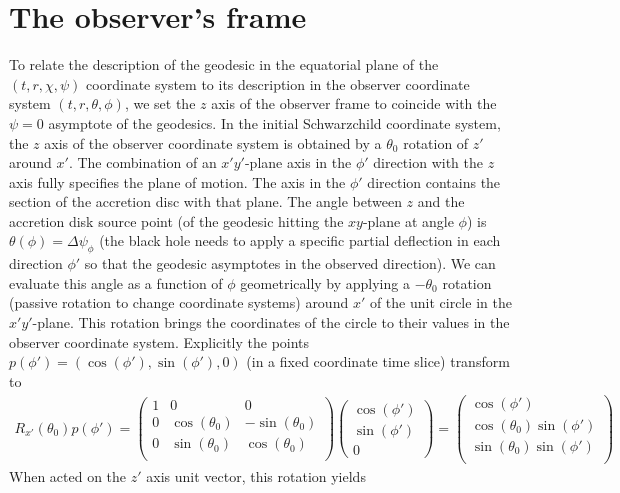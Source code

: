 \documentclass[10pt, a4paper]{article}
\begin{document}
\section{The observer's frame}
To relate the description of the geodesic in the equatorial plane of the $(t, r, \chi, \psi)$ coordinate system to its description in the observer coordinate system $(t, r, \theta, \phi)$, we set the $z$ axis of the observer frame to coincide with the $\psi=0$ asymptote of the geodesics. In the initial Schwarzchild coordinate system, the $z$ axis of the observer coordinate system is obtained by a $\theta_0$ rotation of $z'$ around $x'$. The combination of an $x'y'$-plane axis in the $\phi'$ direction with the $z$ axis fully specifies the plane of motion. The axis in the $\phi'$ direction contains the section of the accretion disc with that plane. The angle between $z$ and the accretion disk source point (of the geodesic hitting the $xy$-plane at angle $\phi$) is $\theta(\phi) = \Delta \psi_\phi$ (the black hole needs to apply a specific partial deflection in each direction $\phi'$ so that the geodesic asymptotes in the observed direction). We can evaluate this angle as a function of $\phi$ geometrically by applying a $-\theta_0$ rotation (passive rotation to change coordinate systems) around $x'$ of the unit circle in the $x'y'$-plane. This rotation brings the coordinates of the circle to their values in the observer coordinate system. Explicitly the points $p(\phi') = (\cos(\phi'), \sin(\phi'), 0)$ (in a fixed coordinate time slice) transform to 
\begin{align*}
  R_{x'}(\theta_0) p(\phi') 
  =
  \begin{pmatrix}
    1 & 0 & 0\\
    0 & \cos(\theta_0) & -\sin(\theta_0)\\
    0 & \sin(\theta_0) & \cos(\theta_0)\\
  \end{pmatrix}
  \begin{pmatrix}
    \cos(\phi')\\
    \sin(\phi')\\
    0
  \end{pmatrix}
  = 
  \begin{pmatrix}
    \cos(\phi')\\
    \cos(\theta_0)\sin(\phi')\\
    \sin(\theta_0)\sin(\phi')\\
  \end{pmatrix}
\end{align*}
When acted on the $z'$ axis unit vector, this rotation yields
\end{document}
